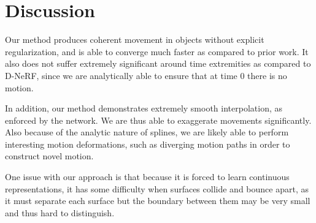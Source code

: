 \section{Discussion}

Our method produces coherent movement in objects without explicit regularization, and is able to
converge much faster as compared to prior work. It also does not suffer extremely significant
around time extremities as compared to D-NeRF, since we are analytically able to ensure that at
time 0 there is no motion.

In addition, our method demonstrates extremely smooth interpolation, as enforced by the network.
We are thus able to exaggerate movements significantly. Also because of the analytic nature
of splines, we are likely able to perform interesting motion deformations, such as diverging
motion paths in order to construct novel motion.

One issue with our approach is that because it is forced to learn continuous representations, it
has some difficulty when surfaces collide and bounce apart, as it must separate each surface but
the boundary between them may be very small and thus hard to distinguish.
